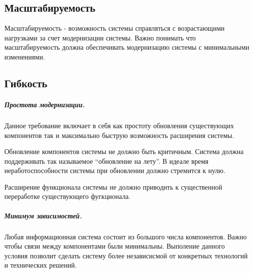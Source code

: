 \subsection{Масштабируемость}
Масштабируемость - возможность системы справляться с возрастающими нагрузками за
счет модернизации системы. Важно понимать что масштабируемость должна
обеспечивать модернизацию системы с минимальными изменениями.

\subsection{Гибкость}
\subparagraph{Простота модернизации.}
Данное требование включает в себя как простоту обновления существующих
компонентов так и максимально быструю возможность расширения системы.

Обновление компонентов системы не должно быть критичным. Система должна
поддерживать так называемое “обновление на лету”. В идеале время неработоспособности системы при обновлении должно стремится к нулю.

Расширение функционала системы не должно приводить к существенной переработке
существующего фугкционала.

\subparagraph{Минимум зависимостей.}
Любая информационная система состоит из большого числа компонентов. Важно чтобы
связи между компонентами были минимальны. Выполение данного условия позволит
сделать систему более независисмой от конкретных технологий и технических
решений.
